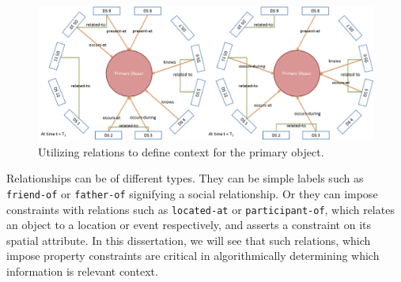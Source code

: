 \begin{figure}[t]
\centering
\includegraphics[width=\textwidth]{media/chapter2/cn.png}
\caption{Utilizing relations to define context for the primary object.}
\label{fig:cn-def}
\end{figure}

Relationships can be of different types. They can be simple labels such as \texttt{friend-of} or \texttt{father-of} signifying a social relationship. Or they can impose constraints with relations such as \texttt{located-at} or \texttt{participant-of}, which relates an object to a location or event respectively, and asserts a constraint on its spatial attribute. In this dissertation, we will see that such relations, which impose property constraints are critical in algorithmically determining which information is relevant context. 

